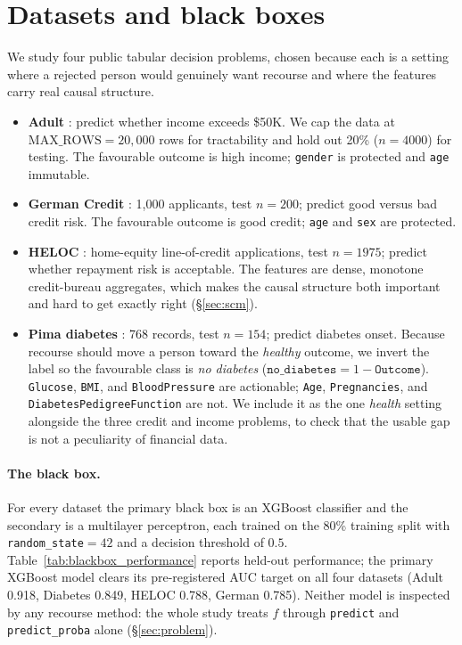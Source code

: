 \section{Datasets and black boxes}
\label{sec:datasets}

We study four public tabular decision problems, chosen because each is a setting
where a rejected person would genuinely want recourse and where the features carry
real causal structure.

\begin{itemize}
  \item \textbf{Adult} \citep{kohavi1996adult,dua2019uci}: predict whether income
    exceeds \$50K. We cap the data at $\text{MAX\_ROWS}=20{,}000$ rows for
    tractability and hold out 20\% ($n=4000$) for testing. The favourable outcome
    is high income; \texttt{gender} is protected and \texttt{age} immutable.
  \item \textbf{German Credit} \citep{dua2019uci}: 1{,}000 applicants, test
    $n=200$; predict good versus bad credit risk. The favourable outcome is good
    credit; \texttt{age} and \texttt{sex} are protected.
  \item \textbf{HELOC} \citep{fico2018heloc}: home-equity line-of-credit
    applications, test $n=1975$; predict whether repayment risk is acceptable. The
    features are dense, monotone credit-bureau aggregates, which makes the causal
    structure both important and hard to get exactly right (\S\ref{sec:scm}).
  \item \textbf{Pima diabetes} \citep{smith1988diabetes}: 768 records, test
    $n=154$; predict diabetes onset. Because recourse should move a person toward
    the \emph{healthy} outcome, we invert the label so the favourable class is
    \emph{no diabetes} ($\texttt{no\_diabetes}=1-\texttt{Outcome}$).
    \texttt{Glucose}, \texttt{BMI}, and \texttt{BloodPressure} are actionable;
    \texttt{Age}, \texttt{Pregnancies}, and \texttt{DiabetesPedigreeFunction} are
    not. We include it as the one \emph{health} setting alongside the three credit
    and income problems, to check that the usable gap is not a peculiarity of
    financial data.
\end{itemize}

\paragraph{The black box.} For every dataset the primary black box is an XGBoost
classifier \citep{chen2016xgboost} and the secondary is a multilayer perceptron,
each trained on the 80\% training split with \texttt{random\_state}$=42$ and a
decision threshold of $0.5$. Table~\ref{tab:blackbox_performance} reports held-out
performance; the primary XGBoost model clears its pre-registered AUC target on all
four datasets (Adult 0.918, Diabetes 0.849, HELOC 0.788, German 0.785). Neither
model is inspected by any recourse method: the whole study treats $f$ through
\texttt{predict} and \texttt{predict\_proba} alone (\S\ref{sec:problem}).

